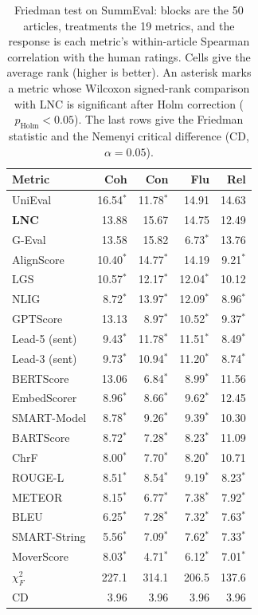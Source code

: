 \begin{table}[t]
\centering
\caption{Friedman test on SummEval: blocks are the 50 articles, treatments the 19 metrics, and the response is each metric's within-article Spearman correlation with the human ratings. Cells give the average rank (higher is better). An asterisk marks a metric whose Wilcoxon signed-rank comparison with LNC is significant after Holm correction ($p_{\mathrm{Holm}}<0.05$). The last rows give the Friedman statistic and the Nemenyi critical difference (CD, $\alpha=0.05$).}
\label{tab:friedman}
\small
\begin{tabular}{@{}lrrrr@{}}
\toprule
Metric & Coh & Con & Flu & Rel \\
\midrule
UniEval & 16.54$^{*}$ & 11.78$^{*}$ & 14.91 & 14.63 \\
\textbf{LNC} & 13.88 & 15.67 & 14.75 & 12.49 \\
G-Eval & 13.58 & 15.82 & 6.73$^{*}$ & 13.76 \\
AlignScore & 10.40$^{*}$ & 14.77$^{*}$ & 14.19 & 9.21$^{*}$ \\
LGS & 10.57$^{*}$ & 12.17$^{*}$ & 12.04$^{*}$ & 10.12 \\
NLIG & 8.72$^{*}$ & 13.97$^{*}$ & 12.09$^{*}$ & 8.96$^{*}$ \\
GPTScore & 13.13 & 8.97$^{*}$ & 10.52$^{*}$ & 9.37$^{*}$ \\
Lead-5 (sent) & 9.43$^{*}$ & 11.78$^{*}$ & 11.51$^{*}$ & 8.49$^{*}$ \\
Lead-3 (sent) & 9.73$^{*}$ & 10.94$^{*}$ & 11.20$^{*}$ & 8.74$^{*}$ \\
BERTScore & 13.06 & 6.84$^{*}$ & 8.99$^{*}$ & 11.56 \\
EmbedScorer & 8.96$^{*}$ & 8.66$^{*}$ & 9.62$^{*}$ & 12.45 \\
SMART-Model & 8.78$^{*}$ & 9.26$^{*}$ & 9.39$^{*}$ & 10.30 \\
BARTScore & 8.72$^{*}$ & 7.28$^{*}$ & 8.23$^{*}$ & 11.09 \\
ChrF & 8.00$^{*}$ & 7.70$^{*}$ & 8.20$^{*}$ & 10.71 \\
ROUGE-L & 8.51$^{*}$ & 8.54$^{*}$ & 9.19$^{*}$ & 8.23$^{*}$ \\
METEOR & 8.15$^{*}$ & 6.77$^{*}$ & 7.38$^{*}$ & 7.92$^{*}$ \\
BLEU & 6.25$^{*}$ & 7.28$^{*}$ & 7.32$^{*}$ & 7.63$^{*}$ \\
SMART-String & 5.56$^{*}$ & 7.09$^{*}$ & 7.62$^{*}$ & 7.33$^{*}$ \\
MoverScore & 8.03$^{*}$ & 4.71$^{*}$ & 6.12$^{*}$ & 7.01$^{*}$ \\
\midrule
$\chi^2_F$ & 227.1 & 314.1 & 206.5 & 137.6 \\
CD & 3.96 & 3.96 & 3.96 & 3.96 \\
\bottomrule
\end{tabular}
\end{table}
